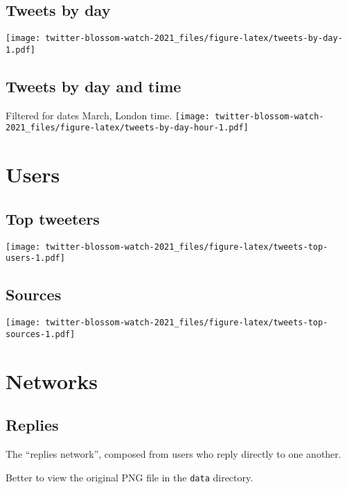 \documentclass[
]{article}
\begin{document}
\hypertarget{tweets-by-day}{%
\subsection{Tweets by day}\label{tweets-by-day}}

\texttt{[image: twitter-blossom-watch-2021\_files/figure-latex/tweets-by-day-1.pdf]}

\hypertarget{tweets-by-day-and-time}{%
\subsection{Tweets by day and time}\label{tweets-by-day-and-time}}

Filtered for dates March, London time.
\texttt{[image: twitter-blossom-watch-2021\_files/figure-latex/tweets-by-day-hour-1.pdf]}

\hypertarget{users}{%
\section{Users}\label{users}}

\hypertarget{top-tweeters}{%
\subsection{Top tweeters}\label{top-tweeters}}

\texttt{[image: twitter-blossom-watch-2021\_files/figure-latex/tweets-top-users-1.pdf]}

\hypertarget{sources}{%
\subsection{Sources}\label{sources}}

\texttt{[image: twitter-blossom-watch-2021\_files/figure-latex/tweets-top-sources-1.pdf]}

\hypertarget{networks}{%
\section{Networks}\label{networks}}

\hypertarget{replies}{%
\subsection{Replies}\label{replies}}

The ``replies network'', composed from users who reply directly to one
another.

Better to view the original PNG file in the \texttt{data} directory.
\end{document}
